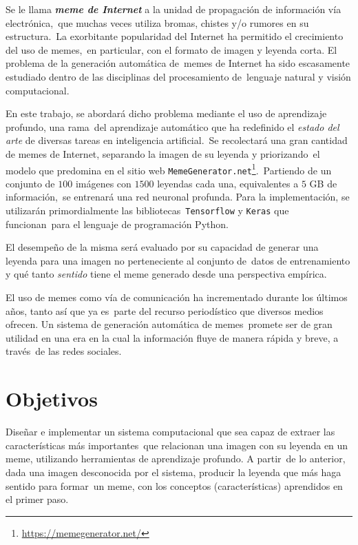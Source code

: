 \documentclass[paper=letter, fontsize=10pt]{scrartcl}
\begin{document}
\noindent
Se le llama \emph{\textbf{meme de Internet}} a la unidad de propagación de información vía electrónica,\
que muchas veces utiliza bromas, chistes y/o rumores en su estructura\cite{shifman2014}.\
La exorbitante popularidad del Internet ha permitido el crecimiento del uso de memes,\
en particular, con el formato de imagen y leyenda corta. El problema de la generación automática de\
memes de Internet ha sido escasamente estudiado dentro de las disciplinas del procesamiento de\
lenguaje natural y visión computacional.\par
En este trabajo, se abordará dicho problema mediante el uso de aprendizaje profundo, una rama\
del aprendizaje automático que ha redefinido el \emph{estado del arte} de diversas tareas en inteligencia artificial.\
Se recolectará una gran cantidad de memes de Internet, separando la imagen de su leyenda y priorizando\
el modelo que predomina en el sitio web \texttt{MemeGenerator.net}\footnote{\url{https://memegenerator.net/}}.\
Partiendo de un conjunto de $100$ imágenes con $1500$ leyendas cada una, equivalentes a $5$ GB de información,\
se entrenará una red neuronal profunda. Para la implementación, se utilizarán primordialmente las bibliotecas\
\texttt{Tensorflow}\cite{tensorflow2015-whitepaper} y \texttt{Keras}\cite{chollet2015keras} que funcionan\
para el lenguaje de programación Python.\par
El desempeño de la misma será evaluado por su capacidad de generar una leyenda para una imagen no perteneciente al conjunto de\
datos de entrenamiento y qué tanto \emph{sentido} tiene el meme generado desde una perspectiva empírica.\par
El uso de memes como vía de comunicación ha incrementado durante los últimos años, tanto así que ya es\
parte del recurso periodístico que diversos medios ofrecen. Un sistema de generación automática de memes\
promete ser de gran utilidad en una era en la cual la información fluye de manera rápida y breve, a través\
de las redes sociales.

\section*{Objetivos}

\noindent
Diseñar e implementar un sistema computacional que sea capaz de extraer las características más importantes\
que relacionan una imagen con su leyenda en un meme, utilizando herramientas de aprendizaje profundo. A partir\
de lo anterior, dada una imagen desconocida por el sistema, producir la leyenda que más haga sentido para formar\
un meme, con los conceptos (características) aprendidos en el primer paso.
\end{document}
